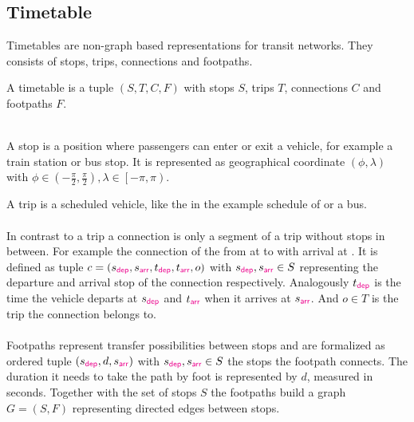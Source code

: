\subsection{Timetable}\label{timetable_sec}
	Timetables  are non-graph based representations for transit networks.
	They consists of stops, trips, connections and footpaths.
	\begin{mydef}\label{timetable}
		A \textnormal{timetable} is a tuple $(S, T, C, F)$ with stops $S$, trips $T$, connections $C$ and footpaths $F$.
	\end{mydef}\quad\\
	A stop is a position where passengers can enter or exit a vehicle, for example a train station or bus stop.
	It is represented as geographical coordinate $(\phi, \lambda)$ with $\phi \in \left(-\frac{\pi}{2}, \frac{\pi}{2}\right),
	\lambda \in \left[-\pi, \pi\right)$.
	
	A trip is a scheduled vehicle, like the \ticef in the example schedule of  or a bus.\\\\
	In contrast to a trip a connection is only a segment of a trip without stops in between. For example the connection
	of the \ticef from \freiburg at  to \offenburg with arrival at .
	It is defined as tuple $c = (s_{\textcolor{magenta}{\textsf{dep}}}, s_{\textcolor{magenta}{\textsf{arr}}}, t_{\textcolor{magenta}{\textsf{dep}}}, t_{\textcolor{magenta}{\textsf{arr}}}, o)$ with $s_{\textcolor{magenta}{\textsf{dep}}}, s_{\textcolor{magenta}{\textsf{arr}}} \in S$ representing the
	departure and arrival stop of the connection respectively. Analogously $t_{\textcolor{magenta}{\textsf{dep}}}$ is the time the vehicle departs
	at $s_{\textcolor{magenta}{\textsf{dep}}}$ and $t_{\textcolor{magenta}{\textsf{arr}}}$ when it arrives at $s_{\textcolor{magenta}{\textsf{arr}}}$. And $o \in T$ is the trip the connection belongs to.\\\\
	Footpaths represent transfer possibilities between stops and are formalized as ordered tuple $(s_{\textcolor{magenta}{\textsf{dep}}}, d, s_{\textcolor{magenta}{\textsf{arr}}})$ with
	$s_{\textcolor{magenta}{\textsf{dep}}}, s_{\textcolor{magenta}{\textsf{arr}}} \in S$ the stops the footpath connects. The duration it needs to take the path by foot is
	represented by $d$, measured in seconds. Together with the set of stops $S$ the footpaths build a graph $G = (S, F)$
	representing directed edges between stops.
	
